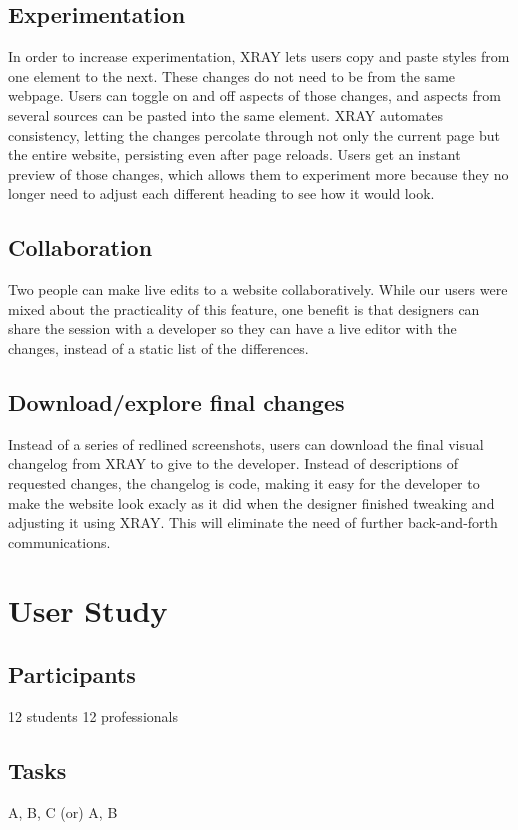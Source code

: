 \documentclass{sigchi}
\newcommand{\xray}{XRAY\xspace}
\begin{document}
\subsection{Experimentation}
In order to increase experimentation, \xray lets users copy and paste styles from one element to the next. These changes do not need to be from the same webpage. Users can toggle on and off aspects of those changes, and aspects from several sources can be pasted into the same element. \xray automates consistency, letting the changes percolate through not only the current page but the entire website, persisting even after page reloads. Users get an instant preview of those changes, which allows them to experiment more because they no longer need to adjust each different heading to see how it would look. 

\subsection{Collaboration}
Two people can make live edits to a website collaboratively. While our users were mixed about the practicality of this feature, one benefit is that designers can share the session with a developer so they can have a live editor with the changes, instead of a static list of the differences. 

\subsection{Download/explore final changes}
Instead of a series of redlined screenshots, users can download the final visual changelog from \xray to give to the developer. Instead of descriptions of requested changes, the changelog is code, making it easy for the developer to make the website look exacly as it did when the designer finished tweaking and adjusting it using \xray. This will eliminate the need of further back-and-forth communications. 

\section{User Study}
\subsection{Participants}
12 students
12 professionals

\subsection{Tasks}
A, B, C (or) A, B
\end{document}
